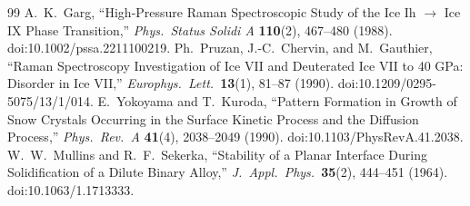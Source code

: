 \documentclass[12pt,letterpaper]{article}
\begin{document}
\begin{thebibliography}{99}
 A.~K.~Garg, ``High-Pressure Raman Spectroscopic Study of the Ice Ih $\to$ Ice IX Phase Transition,'' \emph{Phys.\ Status Solidi A} \textbf{110}(2), 467--480 (1988). doi:10.1002/pssa.2211100219.
 Ph.~Pruzan, J.-C.~Chervin, and M.~Gauthier, ``Raman Spectroscopy Investigation of Ice VII and Deuterated Ice VII to 40 GPa: Disorder in Ice VII,'' \emph{Europhys.\ Lett.}\ \textbf{13}(1), 81--87 (1990). doi:10.1209/0295-5075/13/1/014.
 E.~Yokoyama and T.~Kuroda, ``Pattern Formation in Growth of Snow Crystals Occurring in the Surface Kinetic Process and the Diffusion Process,'' \emph{Phys.\ Rev.\ A} \textbf{41}(4), 2038--2049 (1990). doi:10.1103/PhysRevA.41.2038.
 W.~W.~Mullins and R.~F.~Sekerka, ``Stability of a Planar Interface During Solidification of a Dilute Binary Alloy,'' \emph{J.\ Appl.\ Phys.}\ \textbf{35}(2), 444--451 (1964). doi:10.1063/1.1713333.
\end{thebibliography}
\end{document}
